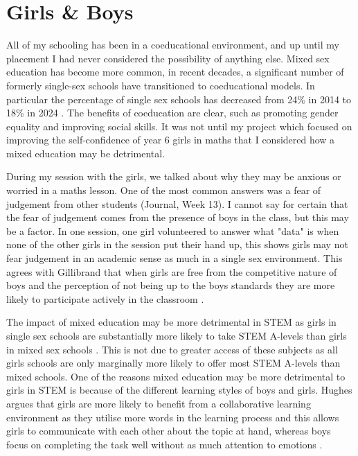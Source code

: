 \documentclass[11pt, a4paper, notitlepage]{article}
\begin{document}
\section*{Girls \& Boys}
All of my schooling has been in a coeducational environment, and up until my placement I had never considered the possibility of anything else. Mixed sex education has become more common, in recent decades, a significant number of formerly single-sex schools have transitioned to coeducational models. In particular the percentage of single sex schools has decreased from 24\% in 2014 to 18\% in 2024 \cite{ICS:2014,ICS:2024}. The benefits of coeducation are clear, such as promoting gender equality and improving social skills. It was not until my project which focused on improving the self-confidence of year 6 girls in maths that I considered how a mixed education may be detrimental.
\par
During my session with the girls, we talked about why they may be anxious or worried in a maths lesson. One of the most common answers was a fear of judgement from other students (Journal, Week 13). I cannot say for certain that the fear of judgement comes from the presence of boys in the class, but this may be a factor. In one session, one girl volunteered to answer what "data" is when none of the other girls in the session put their hand up, this shows girls may not fear judgement in an academic sense as much in a single sex environment. This agrees with Gillibrand that when girls are free from the competitive nature of boys and the perception of not being up to the boys standards they are more likely to participate actively in the classroom \cite{Gillibrand:1999}.
\par
The impact of mixed education may be more detrimental in STEM as girls in single sex schools are substantially more likely to take STEM A-levels than girls in mixed sex schools \cite{Anders:2022}. This is not due to greater access of these subjects as all girls schools are only marginally more likely to offer most STEM A-levels than mixed schools. One of the reasons mixed education may be more detrimental to girls in STEM is because of the different learning styles of boys and girls. Hughes argues that girls are more likely to benefit from a collaborative learning environment as they utilise more words in the learning process and this allows girls to communicate with each other about the topic at hand, whereas boys focus on completing the task well without as much attention to emotions \cite{Hughes:2006}.
\end{document}

